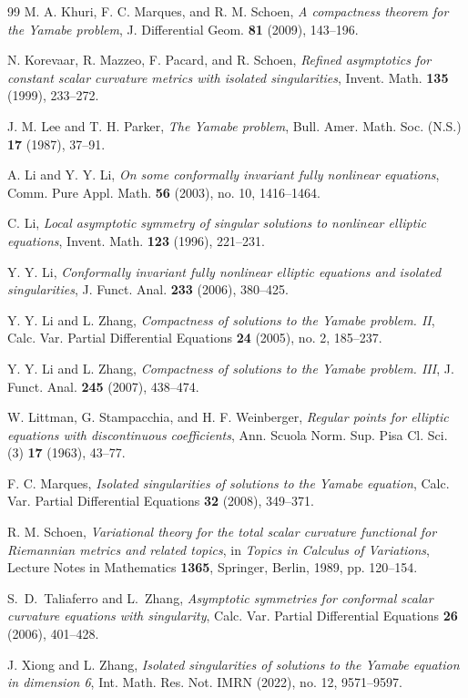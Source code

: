 \documentclass[11pt]{article}
\numberwithin{equation}{section}
\theoremstyle{remark}
\begin{document}
\begin{thebibliography}{99}
M.  A.  Khuri, F.  C.  Marques, and R.  M.  Schoen,
\emph{A compactness theorem for the Yamabe problem},
J. Differential Geom. \textbf{81} (2009), 143--196.

N.  Korevaar, R.  Mazzeo, F.  Pacard, and R.  Schoen,
\emph{Refined asymptotics for constant scalar curvature metrics with
isolated singularities},
Invent. Math. \textbf{135} (1999), 233--272.

J.  M.  Lee and T.  H.  Parker,
\emph{The Yamabe problem},
Bull. Amer. Math. Soc. (N.S.) \textbf{17} (1987), 37--91.

A. Li and Y. Y. Li,
\emph{On some conformally invariant fully nonlinear equations},
Comm. Pure Appl. Math. \textbf{56} (2003), no. 10, 1416--1464.

C.  Li,
\emph{Local asymptotic symmetry of singular solutions to nonlinear elliptic
equations},
Invent. Math. \textbf{123} (1996), 221--231.

Y.  Y.  Li,
\emph{Conformally invariant fully nonlinear elliptic equations and isolated singularities},
J. Funct. Anal. \textbf{233} (2006), 380--425.

Y. Y. Li and L. Zhang,
\emph{Compactness of solutions to the Yamabe problem. II},
Calc. Var. Partial Differential Equations \textbf{24} (2005),
no. 2, 185--237.

Y. Y. Li and L. Zhang,
\emph{Compactness of solutions to the Yamabe problem. III},
J. Funct. Anal. \textbf{245} (2007), 438--474.
            
{
W.  Littman, G.  Stampacchia, and H.  F.  Weinberger,
\emph{Regular points for elliptic equations with discontinuous coefficients},
Ann. Scuola Norm. Sup. Pisa Cl. Sci. (3) \textbf{17} (1963), 43--77.
}

F.  C.  Marques,
\emph{Isolated singularities of solutions to the Yamabe equation},
Calc. Var. Partial Differential Equations \textbf{32} (2008), 349--371.

R.  M.  Schoen,
\emph{Variational theory for the total scalar curvature functional for
Riemannian metrics and related topics},
in \emph{Topics in Calculus of Variations}, Lecture Notes in Mathematics
\textbf{1365}, Springer, Berlin, 1989, pp.  120--154.


S.~D.~Taliaferro and L.~Zhang,
\emph{Asymptotic symmetries for conformal scalar curvature equations
with singularity}, Calc. Var. Partial Differential Equations
\textbf{26} (2006), 401--428.


J.  Xiong and L.  Zhang,
\emph{Isolated singularities of solutions to the Yamabe equation in
dimension 6},
Int. Math. Res. Not. IMRN (2022), no.  12, 9571--9597.

\end{thebibliography}
\endgroup
\end{document}
